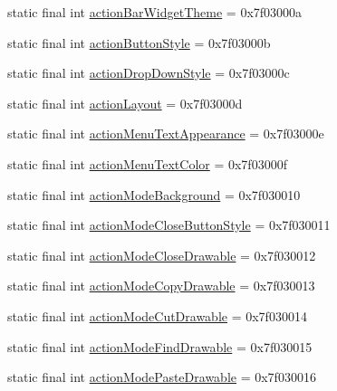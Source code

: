 \begin{DoxyCompactItemize}
\item 
static final int \mbox{\hyperlink{classandroid_1_1support_1_1design_1_1R_1_1attr_af0baa7827e6e80093848731140dc46b6}{action\+Bar\+Widget\+Theme}} = 0x7f03000a
\item 
static final int \mbox{\hyperlink{classandroid_1_1support_1_1design_1_1R_1_1attr_ab12d475fd7924195e1673ccc3d20e441}{action\+Button\+Style}} = 0x7f03000b
\item 
static final int \mbox{\hyperlink{classandroid_1_1support_1_1design_1_1R_1_1attr_a6e485f83950c6df7a7fa7b58b7ce60f1}{action\+Drop\+Down\+Style}} = 0x7f03000c
\item 
static final int \mbox{\hyperlink{classandroid_1_1support_1_1design_1_1R_1_1attr_ad538703779b49b42e926051d5937eb0f}{action\+Layout}} = 0x7f03000d
\item 
static final int \mbox{\hyperlink{classandroid_1_1support_1_1design_1_1R_1_1attr_a18a474dd4d75964fd29507f66ba20918}{action\+Menu\+Text\+Appearance}} = 0x7f03000e
\item 
static final int \mbox{\hyperlink{classandroid_1_1support_1_1design_1_1R_1_1attr_a38bb816c17a2416113a223c4d476c7e5}{action\+Menu\+Text\+Color}} = 0x7f03000f
\item 
static final int \mbox{\hyperlink{classandroid_1_1support_1_1design_1_1R_1_1attr_abc52d011e78f0f7cd31d084707c826fc}{action\+Mode\+Background}} = 0x7f030010
\item 
static final int \mbox{\hyperlink{classandroid_1_1support_1_1design_1_1R_1_1attr_a389cd8e4c024d3acf65d8b5a3ccec912}{action\+Mode\+Close\+Button\+Style}} = 0x7f030011
\item 
static final int \mbox{\hyperlink{classandroid_1_1support_1_1design_1_1R_1_1attr_a539705d65d41d03956688af3b083a80c}{action\+Mode\+Close\+Drawable}} = 0x7f030012
\item 
static final int \mbox{\hyperlink{classandroid_1_1support_1_1design_1_1R_1_1attr_a9709f5fbcd7c014134e7440ba577ad29}{action\+Mode\+Copy\+Drawable}} = 0x7f030013
\item 
static final int \mbox{\hyperlink{classandroid_1_1support_1_1design_1_1R_1_1attr_abdef737ac2e0d89e53de9d49ec74488f}{action\+Mode\+Cut\+Drawable}} = 0x7f030014
\item 
static final int \mbox{\hyperlink{classandroid_1_1support_1_1design_1_1R_1_1attr_a75e6e720c7d37b501bb3b16d326ec282}{action\+Mode\+Find\+Drawable}} = 0x7f030015
\item 
static final int \mbox{\hyperlink{classandroid_1_1support_1_1design_1_1R_1_1attr_afecf65fdc5c7b1990b9100f5078307a0}{action\+Mode\+Paste\+Drawable}} = 0x7f030016

\end{DoxyCompactItemize}
